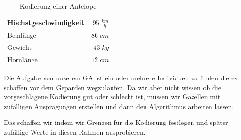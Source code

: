             \begin{multicols}{2}
                \hfill \\[-10mm]
                \begin{table}[H]
                    \begin{center}
                    \begin{tabular}{ |l|r| } 
                        \hline
                        Höchstgeschwindigkeit    & $ 95\; \frac{km}{h}$   \\ \hline
                        Beinlänge                & $ 86\; cm          $   \\ \hline
                        Gewicht                  & $ 43\; kg          $   \\ \hline
                        Hornlänge                & $ 12\; cm          $   \\ \hline
                    \end{tabular}
                    \end{center}
                    \caption{Kodierung einer Antelope \label{fig:somelabel}}
                \end{table}

                \noindent
                Die Aufgabe von unserem GA ist ein oder mehrere Individuen zu finden die es schaffen vor dem Geparden wegzulaufen. Da wir aber nicht wissen ob die vorgeschlagene Kodierung gut oder schlecht ist, müssen wir Gazellen mit zufälligen Ausprägungen erstellen und dann den Algorithmus arbeiten lassen.
            \end{multicols}
            \noindent
            Das schaffen wir indem wir Grenzen für die Kodierung festlegen und später zufällige Werte in diesen Rahmen ausprobieren.

